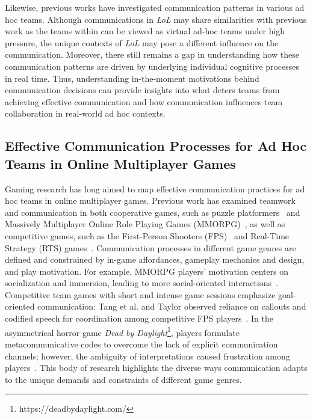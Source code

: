 Likewise, previous works have investigated communication patterns in various ad hoc teams. Although communications in \textit{LoL} may share similarities with previous work as the teams within can be viewed as virtual ad-hoc teams under high pressure, the unique contexts of \textit{LoL} may pose a different influence on the communication. 
Moreover, there still remains a gap in understanding how these communication patterns are driven by underlying individual cognitive processes in real time. Thus, understanding in-the-moment motivations behind communication decisions can provide insights into what deters teams from achieving effective communication and how communication influences team collaboration in real-world ad hoc contexts.

\subsection{Effective Communication Processes for Ad Hoc Teams in Online Multiplayer Games}

Gaming research has long aimed to map effective communication practices for ad hoc teams in online multiplayer games. Previous work has examined teamwork and communication in both cooperative games, such as puzzle platformers~\cite{tan2021less} and Massively Multiplayer Online Role Playing Games (MMORPG)~\cite{petter2011}, as well as competitive games, such as the First-Person Shooters (FPS)~\cite{tang2012verbal, taylor2012fps} and Real-Time Strategy (RTS) games~\cite{laato2024starcraft}. Communication processes in different game genres are defined and constrained by in-game affordances, gameplay mechanics and design, and play motivation. For example, MMORPG players' motivation centers on socialization and immersion, leading to more social-oriented interactions~\cite{bisberg2022contagion}. Competitive team games with short and intense game sessions emphasize goal-oriented communication: Tang et al. and Taylor observed reliance on callouts and codified speech for coordination among competitive FPS players~\cite{taylor2012fps, tang2012verbal}. In the asymmetrical horror game \textit{Dead by Daylight}\footnote{https://deadbydaylight.com/}, players formulate metacommunicative codes to overcome the lack of explicit communication channels; however, the ambiguity of interpretations caused frustration among players~\cite{deslauriers2020dbd}. This body of research highlights the diverse ways communication adapts to the unique demands and constraints of different game genres. 

